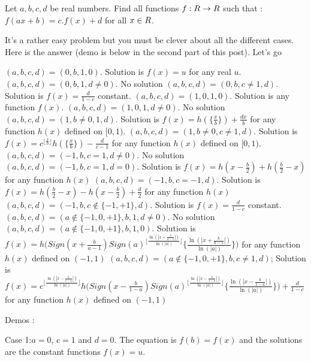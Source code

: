 \begin{mysolution}
	\begin{tcolorbox}Let $ a,b,c,d$ be real numbers. Find all functions $ \large f : R \to R$ such that :
            $ f(ax + b) = c.f(x) + d$
for all $ \large x \in R$.\end{tcolorbox}

It's a rather easy problem but you must be clever about all the different cases.
Here is the answer (demo is below in the second part of this post). Let's go 

$ (a,b,c,d) = (0,b,1,0)$. Solution is $ f(x) = u$ for any real $ u$.
$ (a,b,c,d) = (0,b,1,d\neq 0)$. No solution
$ (a,b,c,d) = (0,b,c\neq 1,d)$. Solution is $ f(x) = \frac {d}{1 - c}$ constant.
$ (a,b,c,d) = (1,0,1,0)$. Solution is any function $ f(x)$.
$ (a,b,c,d) = (1,0,1,d\neq 0)$. No solution
$ (a,b,c,d) = (1,b\neq 0,1,d)$. Solution is $ f(x) = h(\{\frac {x}{b}\}) + \frac {dx}{b}$ for any function $ h(x)$ defined on $ [0,1)$.
$ (a,b,c,d) = (1,b\neq 0,c\neq 1,d)$. Solution is $ f(x) = c^{\lfloor\frac {x}{b}\rfloor }h(\{\frac {x}{b}\}) - \frac {d}{c - 1}$ for any function $ h(x)$ defined on $ [0,1)$.
$ (a,b,c,d) = ( - 1,b,c = 1,d\neq 0)$. No solution
$ (a,b,c,d) = ( - 1,b,c = 1,d = 0)$. Solution is $ f(x) = h(x - \frac {b}{2}) + h(\frac {b}{2} - x)$  for any function $ h(x)$
$ (a,b,c,d) = ( - 1,b,c = - 1,d)$. Solution is $ f(x) = h(\frac {b}{2} - x) - h(x - \frac {b}{2}) + \frac {d}{2}$  for any function $ h(x)$
$ (a,b,c,d) = ( - 1,b,c\notin\{ - 1, + 1\},d)$. Solution is $ f(x) = \frac {d}{1 - c}$ constant.
$ (a,b,c,d) = (a\notin\{ - 1,0, + 1\},b,1,d\neq 0)$. No solution
$ (a,b,c,d) = (a\notin\{ - 1,0, + 1\},b,1,0)$. Solution is $ f(x) = h(Sign(x + \frac {b}{a - 1})Sign(a)^{\lfloor\frac {\ln(|x + \frac {b}{a - 1}|)}{\ln(|a|)}\rfloor}{\{\frac {\ln(|x + \frac {b}{a - 1}|)}{\ln(|a|)}\})}$ for any function $ h(x)$ defined on $ ( - 1,1)$
$ (a,b,c,d) = (a\notin\{ - 1,0, + 1\},b,c\neq 1,d)$; Solution is $ f(x) = c^{\lfloor\frac {\ln(|x - \frac {b}{1 - a}|)}{\ln(|a|)}\rfloor}h(Sign(x - \frac {b}{1 - a})Sign(a)^{\lfloor\frac {\ln(|x - \frac {b}{1 - a}|)}{\ln(|a|)}\rfloor}{\{\frac {\ln(|x - \frac {b}{1 - a}|)}{\ln(|a|)}\}) + \frac {d}{1 - c}}$ for any function $ h(x)$ defined on $ ( - 1,1)$


Demos :

Case 1:$ a = 0$, $ c = 1$ and $ d = 0$. The equation is $ f(b) = f(x)$ and the solutions are the constant functions $ f(x) = u$.


\end{mysolution}
